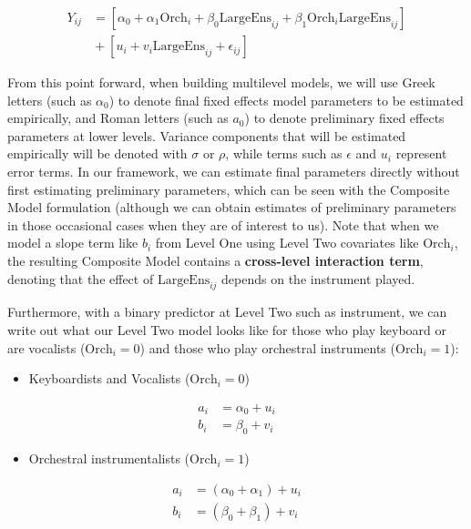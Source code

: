 \documentclass[
]{krantz}
\providecommand{\tightlist}{%
  \setlength{\itemsep}{0pt}\setlength{\parskip}{0pt}}
\begin{document}
\begin{align*}
Y_{ij} & = [\alpha_{0}+\alpha_{1}\textrm{Orch}_{i}+\beta_{0}\textrm{LargeEns}_{ij}+\beta_{1}\textrm{Orch}_{i}\textrm{LargeEns}_{ij}] \\
 & \textrm{} + [u_{i}+v_{i}\textrm{LargeEns}_{ij}+\epsilon_{ij}]
\end{align*}

From this point forward, when building multilevel models, we will use Greek letters (such as \(\alpha_{0}\)) to denote final fixed effects model parameters to be estimated empirically, and Roman letters (such as \(a_{0}\)) to denote preliminary fixed effects parameters at lower levels. Variance components that will be estimated empirically will be denoted with \(\sigma\) or \(\rho\), while terms such as \(\epsilon\) and \(u_{i}\) represent error terms. In our framework, we can estimate final parameters directly without first estimating preliminary parameters, which can be seen with the Composite Model formulation (although we can obtain estimates of preliminary parameters in those occasional cases when they are of interest to us). Note that when we model a slope term like \(b_{i}\) from Level One using Level Two covariates like \(\textrm{Orch}_{i}\), the resulting Composite Model contains a \textbf{cross-level interaction term},  denoting that the effect of \(\textrm{LargeEns}_{ij}\) depends on the instrument played.

Furthermore, with a binary predictor at Level Two such as instrument, we can write out what our Level Two model looks like for those who play keyboard or are vocalists (\(\textrm{Orch}_{i}=0\)) and those who play orchestral instruments (\(\textrm{Orch}_{i}=1\)):

\begin{itemize}
\tightlist
\item
  Keyboardists and Vocalists (\(\textrm{Orch}_{i}=0\))
\end{itemize}

\begin{align*}
a_{i} & = \alpha_{0}+u_{i} \\
b_{i} & = \beta_{0}+v_{i}
\end{align*}

\begin{itemize}
\tightlist
\item
  Orchestral instrumentalists (\(\textrm{Orch}_{i}=1\))
\end{itemize}

\begin{align*}
a_{i} & = (\alpha_{0}+\alpha_{1})+u_{i} \\
b_{i} & = (\beta_{0}+\beta_{1})+v_{i}
\label{eq:level2byorch}
\end{align*}
\end{document}
